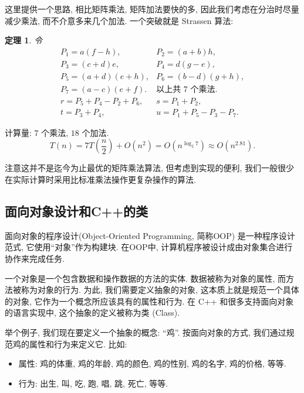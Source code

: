 \documentclass[a4paper]{ctexart}
\newtheorem{theorem}{定理}
\theoremstyle{definition}
\theoremstyle{definition}
\begin{document}
这里提供一个思路, 相比矩阵乘法, 矩阵加法要快的多, 因此我们考虑在分治时尽量减少乘法, 而不介意多来几个加法. 
一个突破就是 Strassen 算法: 

\begin{theorem}
  令 
  \begin{equation}
    \begin{array}{ll}
      P_1 = a(f - h), & P_2 = (a + b) h, \\
      P_3 = (c + d) e, & P_4 = d(g - e), \\
      P_5 = (a + d)(e + h), & P_6 = (b - d)(g + h), \\
      P_7 = (a - c)(e + f). & \mbox{以上共 $7$ 个乘法}. \\
      r = P_5 + P_4 - P_2 + P_6, & s = P_1 + P_2, \\
      t = P_3 + P_4, & u = P_1 + P_5 - P_3 - P_7.
    \end{array}
  \end{equation}
\end{theorem}

计算量: $7$ 个乘法, $18$ 个加法. 
\begin{equation}
  T(n) = 7 T(\frac{n}{2}) + O(n^2) = O(n^{\log_2 7}) \approx O(n^{2.81}).
\end{equation}

注意这并不是迄今为止最优的矩阵乘法算法, 但考虑到实现的便利, 
我们一般很少在实际计算时采用比标准乘法操作更复杂操作的算法. 

\subsection{面向对象设计和C++的类}
面向对象的程序设计(Object-Oriented Programming, 简称OOP) 是一种程序设计范式, 它使用``对象''作为构建块. 在OOP中, 
计算机程序被设计成由对象集合进行协作来完成任务.

一个对象是一个包含数据和操作数据的方法的实体. 数据被称为对象的属性, 而方法被称为对象的行为. 为此, 我们需要定义抽象的对象, 
这本质上就是规范一个具体的对象, 它作为一个概念所应该具有的属性和行为. 在 C++ 和很多支持面向对象的语言实现中, 
这个抽象的定义被称为类 (Class).

举个例子, 我们现在要定义一个抽象的概念: ``鸡''. 按面向对象的方式, 我们通过规范鸡的属性和行为来定义它. 比如:
\begin{itemize}
  \item 属性: 鸡的体重, 鸡的年龄, 鸡的颜色, 鸡的性别, 鸡的名字, 鸡的价格, 等等.
  \item 行为: 出生, 叫, 吃, 跑, 唱, 跳, 死亡, 等等.
\end{itemize}  
\end{document}
